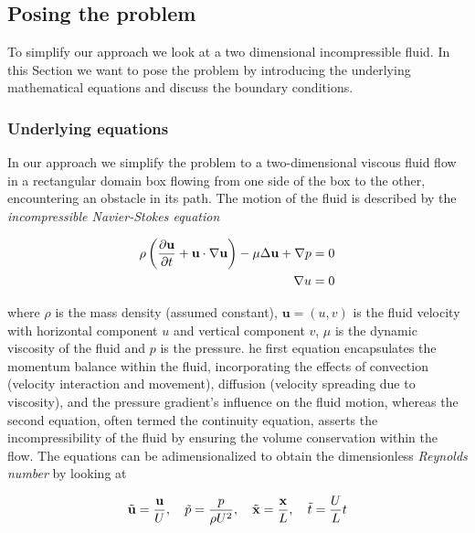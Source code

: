\subsection{Posing the problem}
To simplify our approach we look at a two dimensional incompressible fluid. In this Section we want to pose the problem by introducing the underlying mathematical equations and discuss the boundary conditions.\\

\subsubsection{Underlying equations}
In our approach we simplify the problem to a two-dimensional viscous fluid flow in a rectangular domain box flowing from one side of the box to the other, encountering an obstacle in its path. The motion of the fluid is described by the \textit{incompressible Navier-Stokes equation}

\begin{align}
    \rho \left( \frac{\partial \textbf{u}}{\partial t}  + \textbf{u} \cdot \nabla \textbf{u} \right)- \mu \Delta \textbf{u}+ \nabla p =0 \label{eq: incompressNS} \\
    \nabla u = 0 \notag
\end{align}

where $\rho$ is the mass density (assumed constant), $\textbf{u} = (u,v)$ is the fluid velocity with horizontal component $u$ and vertical component $v$, $\mu$ is the dynamic viscosity of the fluid and $p$ is the pressure. he first equation encapsulates the momentum balance within the fluid, incorporating the effects of convection (velocity interaction and movement), diffusion (velocity spreading due to viscosity), and the pressure gradient's influence on the fluid motion, whereas the second equation, often termed the continuity equation, asserts the incompressibility of the fluid by ensuring the volume conservation within the flow. The equations can be adimensionalized to obtain the dimensionless \textit{Reynolds number} by looking at

\begin{align}
    \Tilde{\textbf{u}} = \frac{\textbf{u}}{U}, \quad \Tilde{p} = \frac{p}{\rho U^2}, \quad \Tilde{\textbf{x}} = \frac{\textbf{x}}{L}, \quad \Tilde{t} = \frac{U}{L}t
\end{align}

